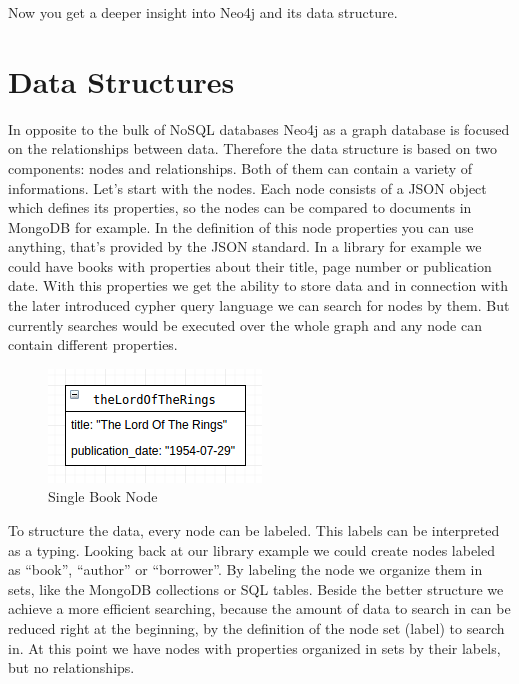 Now you get a deeper insight into Neo4j and its data structure.

\section{Data Structures}

In opposite to the bulk of NoSQL databases Neo4j as a graph database is focused on the relationships between data.
Therefore the data structure is based on two components: nodes and relationships. Both of them can contain a variety of informations.
Let's start with the nodes. Each node consists of a JSON object which defines its properties, so the nodes can be compared to documents in MongoDB for example. In the definition of this node properties you can use anything, that's provided by the JSON standard. In a library for example we could have books with properties about their title, page number or publication date.
With this properties we get the ability to store data and in connection with the later introduced cypher query language we can search for nodes by them. But currently searches would be executed over the whole graph and any node can contain different properties.
\cite["Nodes", para. 3]{NeoTechnologyInc.2017c} \cite[p. 80]{Gupta.2015} \cite[slide 20-21]{Hunger.2013}

\begin{figure}[H]
	\includegraphics[width=\linewidth,keepaspectratio]{images/neo4j/data-structure/single-node.png}
	\caption{Single Book Node}
\end{figure}

To structure the data, every node can be labeled. This labels can be interpreted as  a typing. Looking back at our library example we could create nodes labeled as “book”, “author” or “borrower”. By labeling the node we organize them in sets, like the MongoDB collections or SQL tables.
Beside the better structure we achieve a more efficient searching, because the amount of data to search in can be reduced right at the beginning, by the definition of the node set (label) to search in.
At this point we have nodes with properties organized in sets by their labels, but no relationships.
\cite["Labels", para. 2]{NeoTechnologyInc.2017c} \cite[slide 26-27]{Hunger.2013}

